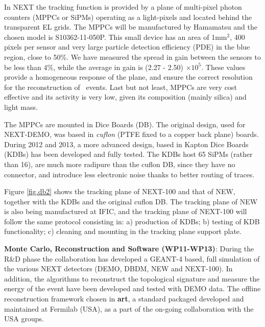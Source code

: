 In NEXT the tracking function is provided by a plane of multi-pixel photon counters (MPPCs or SiPMs) operating as a light-pixels and located behind the transparent EL grids. The MPPCs will be manufactured by Hamamatsu and the chosen model is S10362-11-050P. This small device has an area of 1mm$^2$, 400 pixels per sensor and very large 
particle detection efficiency (PDE) in the blue region, close to 50\%. We have measured the spread in gain between the sensors to be less than 4\%, while the average in gain is (2.27 - 2.50) $\times10^5$. These values provide a homogeneous response of the plane, and ensure the correct resolution for the reconstruction of \bb\ events. Last but not least, MPPCs are very cost effective and its activity is very low, given its composition (mainly silica) and  light mass. 

The MPPCs are mounted in Dice Boards (DB). The original design, used for NEXT-DEMO, was based in   {\em cuflon} (PTFE fixed to a copper back plane) boards. During 2012 and 2013, a more advanced design, based in Kapton Dice Boards (KDBs) has been developed and fully tested. The KDBs host 65 SiPMs (rather than 16), are much more radipure than the  cuflon DB, since they have no connector, and introduce less electronic noise thanks to better routing of traces. 

Figure \ref{fig.db2} shows the tracking plane of NEXT-100 and that of NEW, together with the KDBs and the original cuflon DB. The tracking plane of NEW is also being manufactured at IFIC, and the tracking plane of NEXT-100 will follow the same protocol consisting in: a) production of KDBs; b) testing of KDB functionality; c) cleaning and mounting in the tracking plane support plate. 

{\bf Monte Carlo, Reconstruction and Software (WP11-WP13)}: During the R\&D phase the collaboration has developed a GEANT-4 based, full simulation of the various NEXT detectors (DEMO, DBDM, NEW and NEXT-100). In addition, the algorithms to reconstruct the topological signature and measure the energy of the event have been developed and tested with DEMO data. The offline reconstruction framework chosen in {\bf art}, a standard packaged developed and maintained at Fermilab (USA), as a part of the on-going collaboration with the USA groups. 